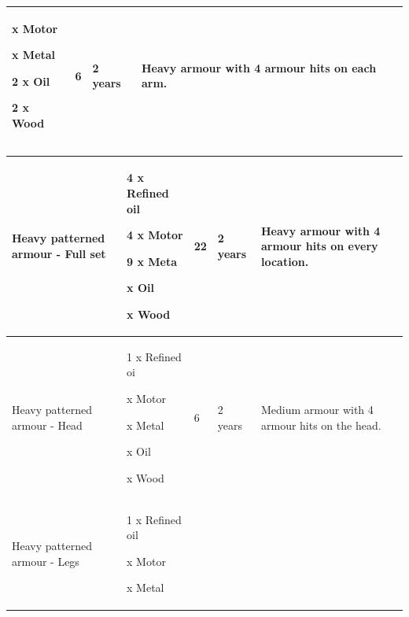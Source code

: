 \begin{table}
\begin{tabular}{|l|l|l|l|l|}
x Motor

x Metal

2 x Oil\par 2 x Wood & 6 & 2 years & Heavy armour with 4 armour hits on each arm. \\
 \hline \end{tabular}

\end{table}

\begin{table}
\begin{tabular}{|l|l|l|l|l|} \hline 
Heavy patterned armour - Full set & 4 x Refined oil\par 4 x Motor\par 9 x Meta
\setcounter{enumi}{6}

x Oil

x Wood

 & 22 & 2 years & Heavy armour with 4 armour hits on every location. \\
 \hline Heavy patterned armour - Head & 1 x Refined oi

x Motor

x Metal

x Oil

x Wood

 & 6 & 2 years & Medium armour with 4 armour hits on the head. \\
 \hline Heavy patterned armour - Legs & 1 x Refined oil\par

x Motor

x Metal


\end{tabular}
\end{table}
